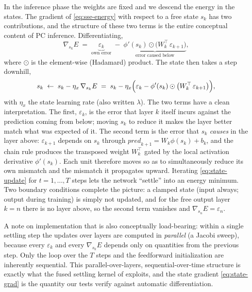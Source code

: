 In the inference phase the weights are fixed and we descend the energy in the states. The gradient
of \cref{eq:sse-energy} with respect to a free state $s_k$ has two contributions, and the
structure of these two terms is the entire conceptual content of PC inference. Differentiating,
\begin{equation}
  \nabla_{s_k} E \;=\; \underbrace{\varepsilon_k}_{\text{own error}}
  \;-\; \underbrace{\phi'(s_k)\odot\bigl(W_k^\top\,\varepsilon_{k+1}\bigr)}_{\text{error caused below}},
  \label{eq:state-grad}
\end{equation}
where $\odot$ is the element-wise (Hadamard) product. The state then takes a step downhill,
\begin{equation}
  s_k \;\leftarrow\; s_k - \eta_x\,\nabla_{s_k} E
  \;=\; s_k - \eta_x\Bigl(\varepsilon_k - \phi'(s_k)\odot\bigl(W_k^\top\,\varepsilon_{k+1}\bigr)\Bigr),
  \label{eq:state-update}
\end{equation}
with $\eta_x$ the state learning rate (also written $\lambda$). The two terms have a clean
interpretation. The first, $\varepsilon_k$, is the error that layer $k$ itself incurs against the
prediction coming from below; moving $s_k$ to reduce it makes the layer better match what was
expected of it. The second term is the error that $s_k$ \emph{causes} in the layer above:
$\varepsilon_{k+1}$ depends on $s_k$ through $\mathit{pred}_{k+1} = W_k\phi(s_k) + b_k$, and the
chain rule produces the transposed weight $W_k^\top$ gated by the local activation derivative
$\phi'(s_k)$. Each unit therefore moves so as to simultaneously reduce its own mismatch and the
mismatch it propagates upward. Iterating \cref{eq:state-update} for $t = 1,\dots,T$ steps lets the
network ``settle'' into an energy minimum. Two boundary conditions complete the picture: a clamped
state (input always; output during training) is simply not updated, and for the free output layer
$k=n$ there is no layer above, so the second term vanishes and $\nabla_{s_n} E = \varepsilon_n$.

A note on implementation that is also conceptually load-bearing: within a single settling step the
updates over layers are computed in \emph{parallel} (a Jacobi sweep), because every
$\varepsilon_k$ and every $\nabla_{s_k} E$ depends only on quantities from the previous step. Only
the loop over the $T$ steps and the feedforward initialization are inherently sequential. This
parallel-over-layers, sequential-over-time structure is exactly what the fused settling kernel of
 exploits, and the state gradient \cref{eq:state-grad} is the quantity our tests
verify against automatic differentiation.

